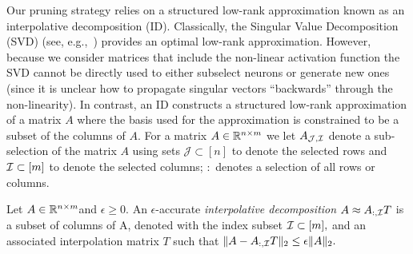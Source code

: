 
Our pruning strategy relies on a structured low-rank approximation known as an interpolative decomposition (ID). 
Classically, the Singular Value Decomposition (SVD) (see, e.g.,~\cite{GVL}) provides an optimal low-rank approximation. However, because we consider matrices that include the non-linear activation function the SVD cannot be directly used to either subselect neurons or generate new ones (since it is unclear how to propagate singular vectors ``backwards'' through the non-linearity). In contrast, an ID constructs a structured low-rank approximation of a matrix $A$ where the basis used for the approximation is constrained to be a subset of the columns of $A$. For a matrix $A\in\mathbb{R}^{n\times m}$ we let $A_{\mathcal{J},\mathcal{I}}$ denote a sub-selection of the matrix $A$ using sets $\mathcal{J}\subset [n]$ to denote the selected rows and $\mathcal{I}\subset [m]$ to denote the selected columns; $:$ denotes a selection of all rows or columns.

\begin{definition}
\label{def:ID}
Let $A \in \mathbb{R}^{n \times m} $and $\epsilon \geq 0$. 
An $\epsilon$-accurate \emph{interpolative decomposition} 
$A \approx A_{:,\mathcal{I}} T$
is a subset of columns of A, denoted with the index subset $\mathcal{I} \subset [m],$ and an associated interpolation matrix $T$ such that $\|A - A_{:,\mathcal{I}} T \|_2 \leq \epsilon\|A\|_2.$
\end{definition}






